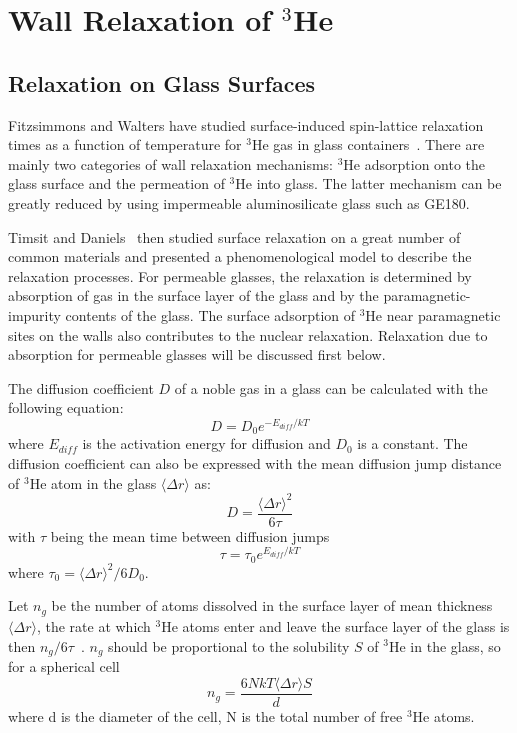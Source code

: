 \section{Wall Relaxation of $^{3}$He}

\subsection{Relaxation on Glass Surfaces}

Fitzsimmons and Walters have studied surface-induced spin-lattice relaxation times as a function of temperature for $^{3}$He gas in glass containers~\cite{PhysRev.179.156}. There are mainly two categories of wall relaxation mechanisms: $^{3}$He adsorption onto the glass surface and the permeation of $^{3}$He into glass. The latter mechanism can be greatly reduced by using impermeable aluminosilicate glass such as GE180. 

Timsit and Daniels~\cite{Timsit} then studied surface relaxation on a great number of common materials and presented a phenomenological model to describe the relaxation processes. For permeable glasses, the relaxation is determined by absorption of gas in the surface layer of the glass and by the paramagnetic-impurity contents of the glass. The surface adsorption of $^{3}$He near paramagnetic sites on the walls also contributes to the nuclear relaxation. Relaxation due to absorption for permeable glasses will be discussed first below.

The diffusion coefficient $D$ of a noble gas in a glass can be calculated with the following equation:
\begin{equation}\label{D}
D=D_{0}e^{-E_{diff}/kT}
\end{equation}
where $E_{diff}$ is the activation energy for diffusion and $D_{0}$ is a constant. The diffusion coefficient can also be expressed with the mean diffusion jump distance of $^{3}$He atom in the glass $\langle\Delta r\rangle$ as:
\begin{equation}
D=\frac{\langle\Delta r\rangle^{2}}{6\tau}
\end{equation}
with $\tau$ being the mean time between diffusion jumps
\begin{equation}\label{residence_time}
\tau=\tau_{0}e^{E_{diff}/kT}
\end{equation}
where $\tau_{0}=\langle\Delta r\rangle^{2}/6D_{0}$.

Let $n_{g}$ be the number of atoms dissolved in the surface layer of mean thickness $\langle\Delta r\rangle$, the rate at which $^{3}$He atoms enter and leave the surface layer of the glass is then $n_{g}/6\tau$~\cite{Timsit}. $n_{g}$ should be proportional to the solubility $S$ of $^{3}$He in the glass, so for a spherical cell
\begin{equation}\label{absorption_ng}
n_{g}=\frac{6NkT\langle\Delta r\rangle S}{d}
\end{equation}
where d is the diameter of the cell, N is the total number of free $^{3}$He atoms.

